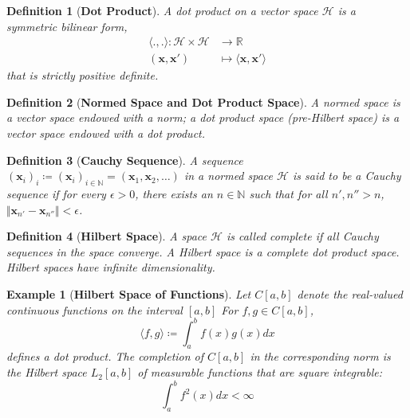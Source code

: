 \documentclass[10pt,landscape]{article}
\newtheorem*{definition*}{Definition}
\newtheorem*{example*}{Example}
\begin{document}
\begin{multicols}{3}
\begin{definition*}[\textbf{Dot Product}]
A dot product on a vector space $\mathcal{H}$ is a symmetric bilinear form,
\begin{align*}
\langle ., . \rangle : \mathcal{H} \times \mathcal{H} & \rightarrow \mathbb{R} \\
\left( \mathbf{x}, \mathbf{x'} \right) & \mapsto \langle \mathbf{x}, \mathbf{x'} \rangle
\end{align*}
that is strictly positive definite.
\end{definition*}

\begin{definition*}[\textbf{Normed Space and Dot Product Space}]
A normed space is a vector space endowed with a norm; a dot product space (pre-Hilbert space) is a vector space endowed with a dot product.
\end{definition*}

\begin{definition*}[\textbf{Cauchy Sequence}]
A sequence $\left( \mathbf{x}_i \right)_i \coloneq \left( \mathbf{x}_i \right)_{i \in \mathbb{N}} = \left( \mathbf{x}_1, \mathbf{x}_2, \dots \right)$ in a normed space $\mathcal{H}$ is said to be a Cauchy sequence if for every $\epsilon > 0$, there exists an $n \in \mathbb{N}$ such that for all $n', n'' > n$, $\Vert \mathbf{x}_{n'} - \mathbf{x}_{n''} \Vert < \epsilon$.
\end{definition*}

\begin{definition*}[\textbf{Hilbert Space}]
A space $\mathcal{H}$ is called complete if all Cauchy sequences in the space converge. A Hilbert space is a complete dot product space. Hilbert spaces have infinite dimensionality.
\end{definition*}

\begin{example*}[\textbf{Hilbert Space of  Functions}]
Let $C\left[a, b\right]$ denote the real-valued continuous functions on the interval $\left[a, b\right]$ For $f, g \in C\left[a, b\right]$,
\begin{equation*}
\langle f, g \rangle \coloneq \int_{a}^{b} f(x)g(x) dx
\end{equation*}
defines a dot product. The completion of $C\left[a, b\right]$ in the corresponding norm is the Hilbert space $L_2 \left[a, b\right]$ of measurable functions that are square integrable:
\begin{equation*}
\int_{a}^{b} f^2(x) dx < \infty
\end{equation*}
\end{example*}


\end{multicols}
\end{document}
